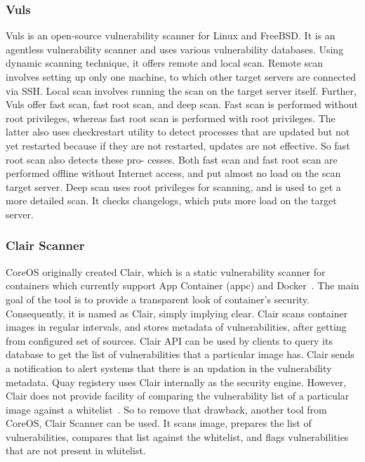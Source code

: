 \documentclass[a4paper,num-refs]{oup-contemporary}
\begin{document}
\subsubsection{Vuls}

Vuls is an open-source vulnerability scanner for Linux and FreeBSD.
It is an agentless vulnerability scanner and uses various
vulnerability databases. Using dynamic scanning technique, it offers
remote and local scan. Remote scan involves setting up only one machine, to
which other target servers are connected via SSH. Local scan involves running
the scan on the target server itself. Further, Vuls offer fast scan, fast root scan,
and deep scan.
Fast scan is performed without root privileges, whereas fast root scan is
performed with root privileges. The latter also uses checkrestart utility to 
detect processes that are updated but not yet restarted because if they are not
restarted, updates are not effective. So fast root scan also detects these pro-
cesses. Both fast scan and fast root scan are performed offline without Internet
access, and put almost no load on the scan target server. Deep scan uses
root privileges for scanning, and is used to get a more detailed scan. It checks
changelogs, which puts more load on the target server.


\subsubsection{Clair Scanner}

CoreOS originally created Clair, which is a static vulnerability scanner for containers which
currently support App Container (appc) and Docker~\cite{coreos_2019}. The main goal of the
tool is to provide a transparent look of container’s security. Consequently, it is
named as Clair, simply implying clear. Clair scans container images in regular
intervals, and stores metadata of vulnerabilities, after getting from configured
set of sources. Clair API can be used by clients to query its database to get
the list of vulnerabilities that a particular image has. Clair sends a notification
to alert systems that there is an updation in the vulnerability metadata. Quay
registery uses Clair internally as the security engine. However, Clair does not 
provide facility of comparing
the vulnerability list of a particular image against a whitelist~\cite{arminc_2019}. So to remove
that drawback, another tool from CoreOS, Clair Scanner can be used. It scans image, prepares the list of
vulnerabilities, compares that list against the whitelist, and flags vulnerabilities
that are not present in whitelist.
\end{document}

